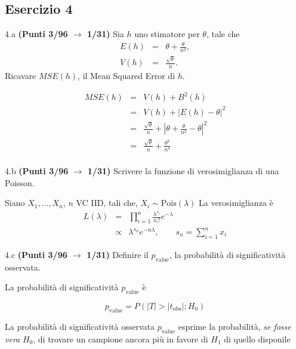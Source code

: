 \documentclass[
  11pt,
]{book}
\theoremstyle{mytheoremstyle}
\theoremstyle{mydefstyle}
\newenvironment{sol}
  {
  \begin{tcolorbox}[enhanced,breakable,arc=0.1mm,boxrule=1pt,colback=white,colframe=iblue,
  title=\bf \fontfamily{lmss}\selectfont \hspace{.5 cm} Soluzione,drop fuzzy shadow]

}{
\end{tcolorbox}
  }
\begin{document}
\subsection{Esercizio 4}\label{esercizio-4-5}

4.a \textbf{(Punti 3/96 \(\rightarrow\) 1/31)} Sia \(h\) uno stimatore per \(\theta\), tale che
\begin{eqnarray*}
E(h)&=&\theta+\frac\theta {n^2},\\
V(h)&=&\frac{\sqrt\theta}{ n}.
\end{eqnarray*}
Ricavare \(MSE(h)\), il Mean Squared Error di \(h\).

\begin{sol}
\begin{eqnarray*}
MSE(h)&=&V(h)+B^2(h)\\
&=&V(h)+|E(h)-\theta|^2\\
&=&\frac{\sqrt\theta}{ n}+\left|\theta+\frac\theta {n^2}-\theta\right|^2\\
&=&\frac{\sqrt\theta}{ n}+\frac{\theta^2} { n^4}\\
\end{eqnarray*}

\end{sol}

4.b \textbf{(Punti 3/96 \(\rightarrow\) 1/31)} Scrivere la funzione di verosimiglianza di una Poisson.

\begin{sol}
Siano \(X_1,...,X_n\), \(n\) VC IID, tali che, \(X_i\sim\text{Pois}(\lambda)\)
La verosimiglianza è
\begin{eqnarray*}
  L(\lambda) &=& \prod_{i=1}^n\frac{\lambda^{x_i}}{x_i!}e^{-\lambda}\\
             &\propto& \lambda^{s_n} e^{-n\lambda},\qquad s_n=\sum_{i=1}^n x_i
\end{eqnarray*}

\end{sol}

4.c \textbf{(Punti 3/96 \(\rightarrow\) 1/31)} Definire il \(p_{\text{value}}\), la probabilità di significatività osservata.

\begin{sol}
La probabilità di significatività \(p_{\text{value}}\) è

\[p_{\text{value}}=P(|T|>|t_{\text{obs}}|;H_0)\]

La probabilità di significatività osservata \(p_\text{value}\) esprime la probabilità, \emph{se fosse vera} \(H_0\),
di trovare un campione ancora più in favore di \(H_1\) di quello disponile

\end{sol}
\end{document}
